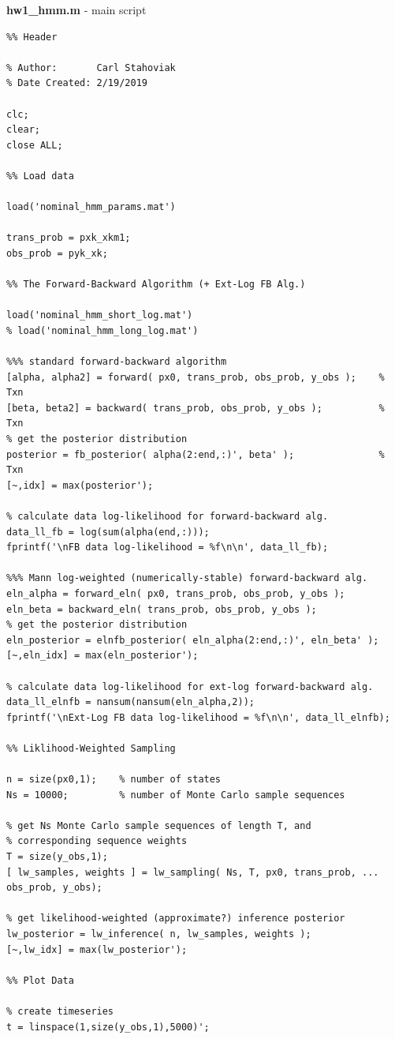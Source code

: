 \documentclass[]{article}
\begin{document}
\textbf{hw1\_hmm.m} - main script
\begin{lstlisting}
%% Header

% Author: 		Carl Stahoviak
% Date Created:	2/19/2019

clc;
clear;
close ALL;

%% Load data

load('nominal_hmm_params.mat')

trans_prob = pxk_xkm1;
obs_prob = pyk_xk;

%% The Forward-Backward Algorithm (+ Ext-Log FB Alg.)

load('nominal_hmm_short_log.mat')
% load('nominal_hmm_long_log.mat')

%%% standard forward-backward algorithm
[alpha, alpha2] = forward( px0, trans_prob, obs_prob, y_obs );    % Txn
[beta, beta2] = backward( trans_prob, obs_prob, y_obs );          % Txn
% get the posterior distribution
posterior = fb_posterior( alpha(2:end,:)', beta' );               % Txn
[~,idx] = max(posterior');

% calculate data log-likelihood for forward-backward alg.
data_ll_fb = log(sum(alpha(end,:)));
fprintf('\nFB data log-likelihood = %f\n\n', data_ll_fb);

%%% Mann log-weighted (numerically-stable) forward-backward alg.
eln_alpha = forward_eln( px0, trans_prob, obs_prob, y_obs );
eln_beta = backward_eln( trans_prob, obs_prob, y_obs );
% get the posterior distribution
eln_posterior = elnfb_posterior( eln_alpha(2:end,:)', eln_beta' );
[~,eln_idx] = max(eln_posterior');

% calculate data log-likelihood for ext-log forward-backward alg.
data_ll_elnfb = nansum(nansum(eln_alpha,2));
fprintf('\nExt-Log FB data log-likelihood = %f\n\n', data_ll_elnfb);

%% Liklihood-Weighted Sampling

n = size(px0,1);    % number of states
Ns = 10000;         % number of Monte Carlo sample sequences

% get Ns Monte Carlo sample sequences of length T, and 
% corresponding sequence weights
T = size(y_obs,1);
[ lw_samples, weights ] = lw_sampling( Ns, T, px0, trans_prob, ...
obs_prob, y_obs);

% get likelihood-weighted (approximate?) inference posterior
lw_posterior = lw_inference( n, lw_samples, weights );
[~,lw_idx] = max(lw_posterior');

%% Plot Data

% create timeseries
t = linspace(1,size(y_obs,1),5000)';


\end{lstlisting}
\end{document}
